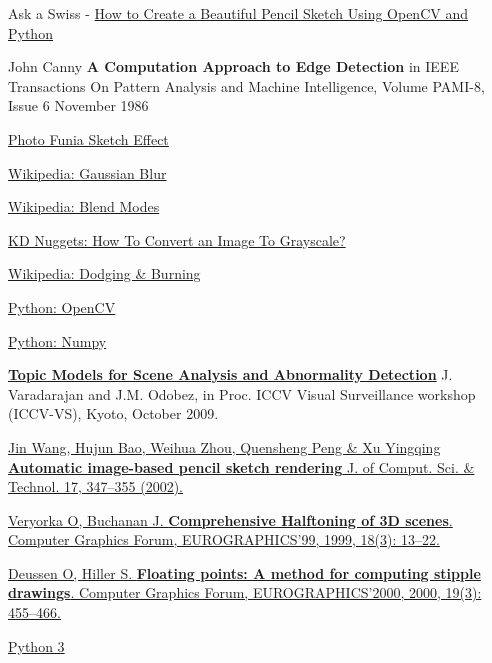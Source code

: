 \documentclass{article}
\begin{document}
\clearpage
\begin{thebibliography}{9}
Ask a Swiss - \href{https://www.askaswiss.com/2016/01/how-to-create-pencil-sketch-opencv-python.html}{How to Create a Beautiful Pencil Sketch Using OpenCV and Python}

John Canny \textbf{A Computation Approach to Edge Detection} in IEEE Transactions On Pattern Analysis 
and Machine Intelligence, Volume PAMI-8, Issue 6 November 1986

\href{https://photofunia.com/effects/sketch}{Photo Funia Sketch Effect}

\href{https://en.wikipedia.org/wiki/Gaussian_blur}{Wikipedia: Gaussian Blur}

\href{https://en.wikipedia.org/wiki/Blend_modes}{Wikipedia: Blend Modes}

\href{https://www.kdnuggets.com/2019/12/convert-rgb-image-grayscale.html}{KD Nuggets: How To Convert an Image To Grayscale?}

\href{https://en.wikipedia.org/wiki/Dodging_and_burning}{Wikipedia: Dodging \& Burning}

\href{https://opencv.org/}{Python: OpenCV}

\href{https://numpy.org/}{Python: Numpy}

\href{https://www.idiap.ch/~odobez/RESSOURCES/DataRelease-TrafficJunction.php}{\textbf{Topic Models for Scene Analysis and Abnormality Detection}}
J. Varadarajan and J.M. Odobez,
in Proc. ICCV Visual Surveillance workshop (ICCV-VS), Kyoto, October 2009.

\href{https://doi.org/10.1007/BF02947313}{Jin Wang, Hujun Bao, Weihua Zhou, Quensheng Peng & Xu Yingqing \textbf{Automatic image-based pencil sketch rendering} J. of Comput. Sci. & Technol. 17, 347–355 (2002).}

\href{http://scholar.google.com/scholar_lookup?&title=Comprehensive\%20halftoning\%20of\%203D\%20scenes&journal=Computer\%20Graphics\%20Forum\%2C\%20EUROGRAPHICS\%2799&volume=18&issue=3&pages=13-22&publication_year=1999&author=Veryorka\%2CO&author=Buchanan\%2CJ}{Veryorka O, Buchanan J. \textbf{Comprehensive Halftoning of 3D scenes}. Computer Graphics Forum, EUROGRAPHICS'99, 1999, 18(3): 13–22.}

\href{http://scholar.google.com/scholar_lookup?&title=Floating\%20points\%3A\%20A\%20method\%20for\%20computing\%20stipple\%20drawings&journal=Computer\%20Graphics\%20Forum\%2C\%20EUROGRAPHICS\%272000&volume=19&issue=3&pages=455-466&publication_year=2000&author=Deussen\%2CO&author=Hiller\%2CS}{Deussen O, Hiller S. \textbf{Floating points: A method for computing stipple drawings}. Computer Graphics Forum, EUROGRAPHICS'2000, 2000, 19(3): 455–466.}

\href{https://www.python.org/}{Python 3}

\end{thebibliography}
\end{document}
